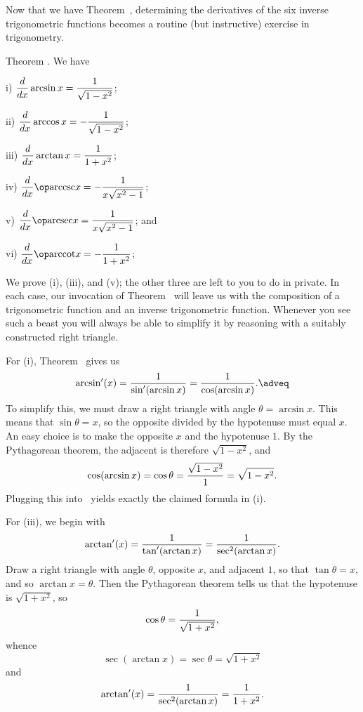 Now that we have Theorem~{\thmderivinverse}, determining the derivatives of the six inverse trigonometric
functions becomes a routine (but instructive) exercise in trigonometry.

\edef\thminversetrig{\the\thmcount}
\proclaim Theorem \advthm. We have
\medskip
\item{i)} $\displaystyle {d\over dx} \arcsin x = {1\over \sqrt{1-x^2}}$;
\smallskip
\item{ii)} $\displaystyle {d\over dx} \arccos x = -{1\over \sqrt{1-x^2}}$;
\medskip
\item{iii)} $\displaystyle {d\over dx} \arctan x = {1\over 1+x^2}$;
\medskip
\item{iv)} $\displaystyle {d\over dx} \arccsc x = -{1\over x\sqrt{x^2-1}}$;
\medskip
\item{v)} $\displaystyle {d\over dx} \arcsec x = {1\over x\sqrt{x^2-1}}$; and
\medskip
\item{vi)} $\displaystyle {d\over dx} \arccot x = -{1\over 1+x^2}$;
\medskip

\proof We prove (i), (iii), and (v); the other three are left to you to do in private.
In each case, our invocation
of Theorem~{\thmderivinverse} will leave us with the composition of a trigonometric function and an inverse
trigonometric function. Whenever you see such a beast you will always be able to simplify it by reasoning
with a suitably constructed right triangle.

For (i), Theorem~{\thmderivinverse} gives us
\edef\eqarcsin{\the\eqcount}
$$\arcsin'(x) = {1\over \sin'(\arcsin x)} = {1\over \cos(\arcsin x)}.\adveq$$
To simplify this, we must draw a right triangle with angle $\theta = \arcsin x$. This means that
$\sin\theta = x$, so the opposite divided by the
hypotenuse must equal $x$. An easy choice is to make the opposite $x$ and the hypotenuse
$1$. By the Pythagorean theorem, the adjacent is therefore $\sqrt{1-x^2}$, and
$$\cos(\arcsin x) = \cos\theta = {\sqrt{1-x^2}\over 1} = \sqrt{1-x^2}.$$
Plugging this into~\refeq{\eqarcsin} yields exactly the claimed formula in (i).

For (iii), we begin with
$$\arctan'(x) = {1\over \tan'(\arctan x)} = {1\over \sec^2(\arctan x)}.$$
Draw a right triangle with angle $\theta$, opposite $x$, and adjacent $1$, so that $\tan\theta = x$,
and so $\arctan x = \theta$. Then the Pythagorean theorem tells us that the hypotenuse is $\sqrt{1+x^2}$,
so
$$\cos\theta = {1\over \sqrt{1+x^2}},$$
whence
$$\sec(\arctan x) = \sec\theta = \sqrt{1+x^2}$$
and
$$\arctan'(x) = {1\over \sec^2(\arctan x)} = {1\over 1+x^2}.$$

